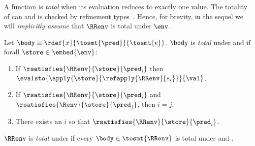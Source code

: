 

%
A function is \emph{total} when its evaluation
reduces to exactly one value.
%
The totality of \RRenv can and is checked
by refinement types~\cite{Vazou14}.
%
Hence, for brevity, in the sequel
we will \emph{implicitly assume}
that $\RRenv$ is total under $\env$.
%
\begin{definition}\label{asm:total}
Let $\body \equiv \rdef{x}{\tosmt{\pred}}{\tosmt{e}}$.
$\body$ is \emph{total} under \env and \RRenv if
forall $\store\in \embed{\env}$:
%
\begin{enumerate}
\item If $\rsatisfies{\RRenv}{\store}{\pred_i}$ then
$\evalsto{{\apply{\store}{\refapply{\RRenv}{e_i}}}}{\val}$.
\item If $\rsatisfies{\RRenv}{\store}{\pred_i}$ and $\rsatisfies{\Renv}{\store}{\pred_j}$, then $i=j$.
\item There exists an $i$ so that  $\rsatisfies{\RRenv}{\store}{\pred_i}$.
\end{enumerate}

$\RRenv$ is \emph{total} under \env
if every $\body \in \tosmt{\RRenv}$
is total under \env and \RRenv.
%
\end{definition}


